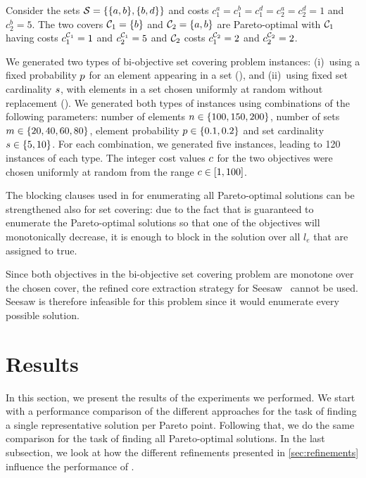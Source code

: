 \begin{example}
  Consider the sets $\mathcal{S} = \{ \{a, b\}, \{b, d\} \}$ and costs $c^a_1 = c^b_1 = c^d_1 = c^a_2 = c^d_2 = 1$ and $c^b_2 = 5$.
  The two covers $\mathcal{C}_1 = \{ b \}$ and $\mathcal{C}_2 = \{ a, b \}$ are Pareto-optimal with $\mathcal{C}_1$ having costs $c^{\mathcal{C}_1}_1 = 1$ and $c^{\mathcal{C}_1}_2 = 5$ and $\mathcal{C}_2$ costs $c^{\mathcal{C}_2}_1 = 2$ and $c^{\mathcal{C}_2}_2 = 2$.
\end{example}

We generated two types of  bi-objective set covering problem instances:
(i)~using a fixed probability $p$ for an element appearing in a set (\scep{}), and (ii)~using fixed set cardinality $s$, with elements in a set chosen uniformly at random without replacement (\scsc{}).
We generated both types of instances using combinations of the following parameters:
number of elements $n\in\{100,150,200\}$, number of sets $m\in\{20,40,60,80\}$, element probability $p\in\{0.1,0.2\}$ and set cardinality $s\in\{5,10\}$.
For each combination, we generated five instances, leading to 120 instances of each type.
The integer cost values $c$ for the two objectives were chosen uniformly at random from the range $c\in[1,100]$.

The blocking clauses used in \algname{} for enumerating all Pareto-optimal solutions can be strengthened also for set covering:
due to the fact that \algname{} is guaranteed to enumerate the Pareto-optimal solutions so that one of the objectives will monotonically decrease, it is enough to block in \algname{} the solution over all $l_e$ that are assigned to true.

Since both objectives in the bi-objective set covering problem are monotone over the chosen cover, the refined core extraction strategy for Seesaw~\autocite{DBLP:conf/cp/JanotaMSM21} cannot be used.
Seesaw is therefore infeasible for this problem since it would enumerate every possible solution.

\section{Results\label{sec:results}}

In this section, we present the results of the experiments we performed.
We start with a performance comparison of the different approaches for the task of finding a single representative solution per Pareto point.
Following that, we do the same comparison for the task of finding all Pareto-optimal solutions.
In the last subsection, we look at how the different refinements presented in \cref{sec:refinements} influence the performance of \algname{}.

